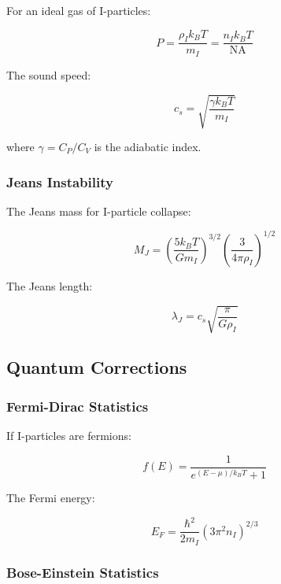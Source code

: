 For an ideal gas of I-particles:

\begin{equation}
\label{eq:ideal_gas}
P = \frac{\rho_I k_B T}{m_I} = \frac{n_I k_B T}{\text{NA}}
\end{equation}

The sound speed:

\begin{equation}
\label{eq:sound_speed}
c_s = \sqrt{\frac{\gamma k_B T}{m_I}}
\end{equation}

where $\gamma = C_P/C_V$ is the adiabatic index.

\subsubsection{Jeans Instability}

The Jeans mass for I-particle collapse:

\begin{equation}
\label{eq:jeans_mass}
M_J = \left(\frac{5k_B T}{Gm_I}\right)^{3/2} \left(\frac{3}{4\pi\rho_I}\right)^{1/2}
\end{equation}

The Jeans length:

\begin{equation}
\label{eq:jeans_length}
\lambda_J = c_s \sqrt{\frac{\pi}{G\rho_I}}
\end{equation}

\subsection{Quantum Corrections}

\subsubsection{Fermi-Dirac Statistics}

If I-particles are fermions:

\begin{equation}
\label{eq:fermi_dirac}
f(E) = \frac{1}{e^{(E-\mu)/k_B T} + 1}
\end{equation}

The Fermi energy:

\begin{equation}
\label{eq:fermi_energy}
E_F = \frac{\hbar^2}{2m_I}(3\pi^2 n_I)^{2/3}
\end{equation}

\subsubsection{Bose-Einstein Statistics}

